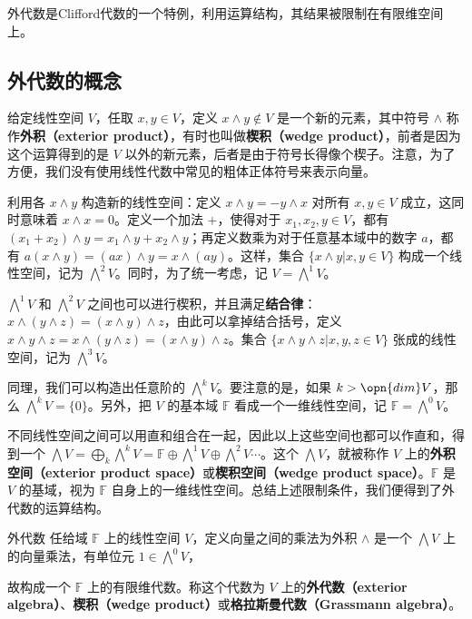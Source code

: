
外代数是Clifford代数的一个特例，利用运算结构，其结果被限制在有限维空间上。

\subsection{外代数的概念}

给定线性空间 $V$，任取 $x, y\in V$，定义 $x\wedge y\not\in V$ 是一个新的元素，其中符号 $\wedge$ 称作\textbf{外积（exterior product）}，有时也叫做\textbf{楔积（wedge product）}，前者是因为这个运算得到的是 $V$ 以外的新元素，后者是由于符号长得像个楔子。注意，为了方便，我们没有使用线性代数中常见的粗体正体符号来表示向量。

利用各 $x\wedge y$ 构造新的线性空间：定义 $x\wedge y=-y\wedge x$ 对所有 $x, y\in V$ 成立，这同时意味着 $x\wedge x=0$。定义一个加法 $+$，使得对于 $x_1, x_2, y\in V$，都有 $(x_1+x_2)\wedge y=x_1\wedge y+x_2\wedge y$；再定义数乘为对于任意基本域中的数字 $a$，都有 $a(x\wedge y)=(ax)\wedge y=x\wedge(ay)$。这样，集合 $\{x\wedge y|x, y\in V\}$ 构成一个线性空间，记为 $\bigwedge^2 V$。同时，为了统一考虑，记 $V=\bigwedge^1 V$。

$\bigwedge^1 V$ 和 $\bigwedge^2 V$ 之间也可以进行楔积，并且满足\textbf{结合律}：$x\wedge(y\wedge z)=(x\wedge y)\wedge z$，由此可以拿掉结合括号，定义 $x\wedge y\wedge z=x\wedge(y\wedge z)=(x\wedge y)\wedge z$。集合 $\{x\wedge y\wedge z|x, y, z\in V\}$ 张成的线性空间，记为 $\bigwedge^3 V$。

同理，我们可以构造出任意阶的 $\bigwedge^k V$。要注意的是，如果 $k>\opn{dim} V$，那么 $\bigwedge^k V=\{0\}$。另外，把 $V$ 的基本域 $\mathbb{F}$ 看成一个一维线性空间，记 $\mathbb{F}=\bigwedge^0 V$。

不同线性空间之间可以用直和组合在一起，因此以上这些空间也都可以作直和，得到一个 $\bigwedge V=\bigoplus_k\bigwedge^k V=\mathbb{F}\oplus\bigwedge^1V\oplus\bigwedge^2V\cdots$。这个 $\bigwedge V$，就被称作 $V$ 上的\textbf{外积空间（exterior product space）}或\textbf{楔积空间（wedge product space）}。$\mathbb{F}$ 是 $V$ 的基域，视为 $\mathbb{F}$ 自身上的一维线性空间。总结上述限制条件，我们便得到了外代数的运算结构。
\begin{definition}{外代数}
任给域 $\mathbb{F}$ 上的线性空间 $V$，定义向量之间的乘法为外积 $\wedge$ 是一个 $\bigwedge V$ 上的向量乘法，有单位元 $1\in \bigwedge^0 V$，




故构成一个 $\mathbb{F}$ 上的有限维代数。称这个代数为 $V$ 上的\textbf{外代数（exterior algebra）}、\textbf{楔积（wedge product）}或\textbf{格拉斯曼代数（Grassmann algebra）}。
\end{definition}


